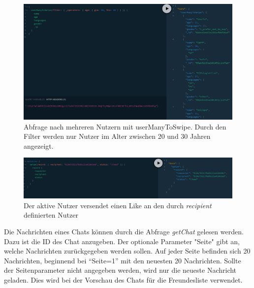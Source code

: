 \begin{figure}
	\centering
    \includegraphics[width=\textwidth]{sources/graphiql_userManyToSwipe.png}
	\caption{Abfrage nach mehreren Nutzern mit userManyToSwipe. Durch den Filter werden nur Nutzer im Alter zwischen 20 und 30 Jahren angezeigt.}
	\label{fig:gql:5}
\end{figure}

\begin{figure}
	\centering
    \includegraphics[width=\textwidth]{sources/graphiql_swipe.png}
	\caption{Der aktive Nutzer versendet einen Like an den durch \textit{recipient} definierten Nutzer}
	\label{fig:gql:6}
\end{figure}

Die Nachrichten eines Chats können durch die Abfrage \textit{getChat} gelesen werden.
Dazu ist die ID des Chat anzugeben.
Der optionale Parameter "Seite" gibt an, welche Nachrichten zurückgegeben werden sollen.
Auf jeder Seite befinden sich 20 Nachrichten, beginnend bei \enquote{Seite=1} mit den neuesten 20 Nachrichten.
Sollte der Seitenparameter nicht angegeben werden, wird nur die neueste Nachricht geladen.
Dies wird bei der Vorschau des Chats für die Freundesliste verwendet.


